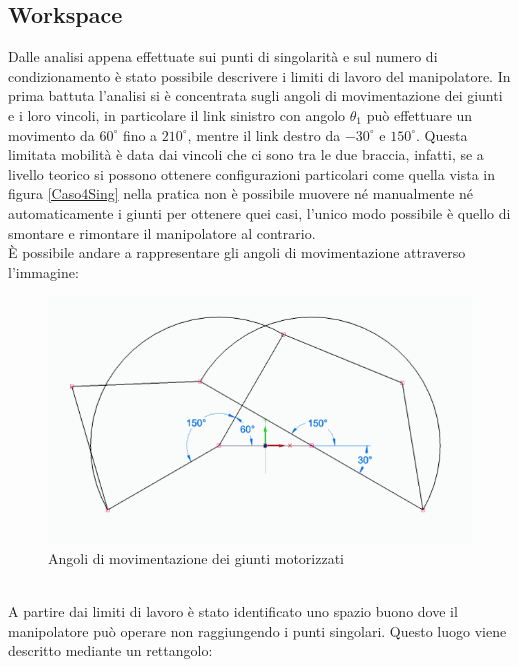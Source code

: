 \subsection{Workspace}
Dalle analisi appena effettuate sui punti di singolarità e sul numero di condizionamento è stato possibile descrivere i limiti di lavoro del manipolatore. In prima battuta l'analisi si è concentrata sugli angoli di movimentazione dei giunti e i loro vincoli, in particolare il link sinistro con angolo $\theta_1$ può effettuare un movimento da $60^\circ$ fino a $210^\circ$, mentre il link destro da $-30^\circ$ e $150^\circ$. Questa limitata mobilità è data dai vincoli che ci sono tra le due braccia, infatti, se a livello teorico si possono ottenere configurazioni particolari come quella vista in figura \ref{Caso4Sing} nella pratica non è possibile muovere né manualmente né automaticamente i giunti per ottenere quei casi, l'unico modo possibile è quello di smontare e rimontare il manipolatore al contrario. \\È possibile andare a rappresentare gli angoli di movimentazione attraverso l'immagine: 
\begin{figure}[ht]
	\begin{center}
		\includegraphics[scale=0.56]{Immagini/Singolarity/workangle}
		\caption{Angoli di movimentazione dei giunti motorizzati}
	\end{center}
\end{figure}
\\A partire dai limiti di lavoro è stato identificato uno spazio buono dove il manipolatore può operare non raggiungendo i punti singolari. Questo luogo viene descritto mediante un rettangolo:
